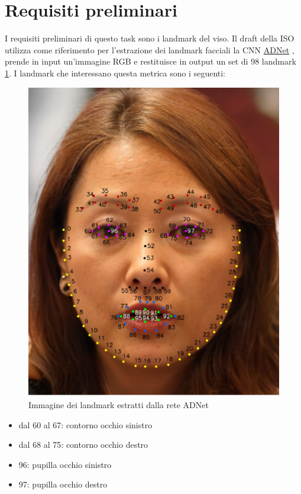 \documentclass[12pt,a4paper,openright,twoside]{book}
\begin{document}
\section{Requisiti preliminari}
I requisiti preliminari di questo task sono i landmark del viso. Il draft della ISO utilizza come riferimento per l'estrazione dei landmark facciali la CNN \href{https://github.com/huangyangyu/ADNet}{ADNet} \cite{9093431}, prende in input un'immagine RGB e restituisce in output un set di 98 landmark \cref{fig:landmark-face}. I landmark che interessano questa metrica sono i seguenti:
\begin{figure}
    \centering
    \includegraphics[width=.6\linewidth]{figures/landmark-face.png}
    \caption{Immagine dei landmark estratti dalla rete ADNet}
    \label{fig:landmark-face}
\end{figure}
\begin{itemize}
    \item dal 60 al 67: contorno occhio sinistro
    \item dal 68 al 75: contorno occhio destro
    \item 96: pupilla occhio sinistro
    \item 97: pupilla occhio destro
\end{itemize}
\end{document}
